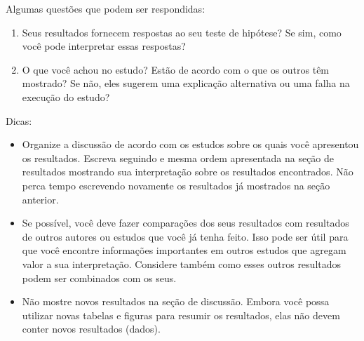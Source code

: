 Algumas questões que podem ser respondidas:
\begin{enumerate}
    \item Seus resultados fornecem respostas ao seu teste de hipótese? Se sim, como você pode interpretar essas respostas?
	\item O que você achou no estudo? Estão de acordo com o que os outros têm mostrado? Se não, eles sugerem uma explicação alternativa ou uma falha na execução do estudo?
\end{enumerate}
Dicas:
\begin{itemize}
    \item Organize a discussão de acordo com os estudos sobre os quais você apresentou os resultados. Escreva seguindo e mesma ordem apresentada na seção de resultados mostrando sua interpretação sobre os resultados encontrados. Não perca tempo escrevendo novamente os resultados já mostrados na seção anterior.
	\item Se possível, você deve fazer comparações dos seus resultados com resultados de outros autores ou estudos que você já tenha feito. Isso pode ser útil para que você encontre informações importantes em outros estudos que agregam valor a sua interpretação. Considere também como esses outros resultados podem ser combinados com os seus.
	\item Não mostre novos resultados na seção de discussão. Embora você possa utilizar novas tabelas e figuras para resumir os resultados, elas não devem conter novos resultados (dados).

\end{itemize}